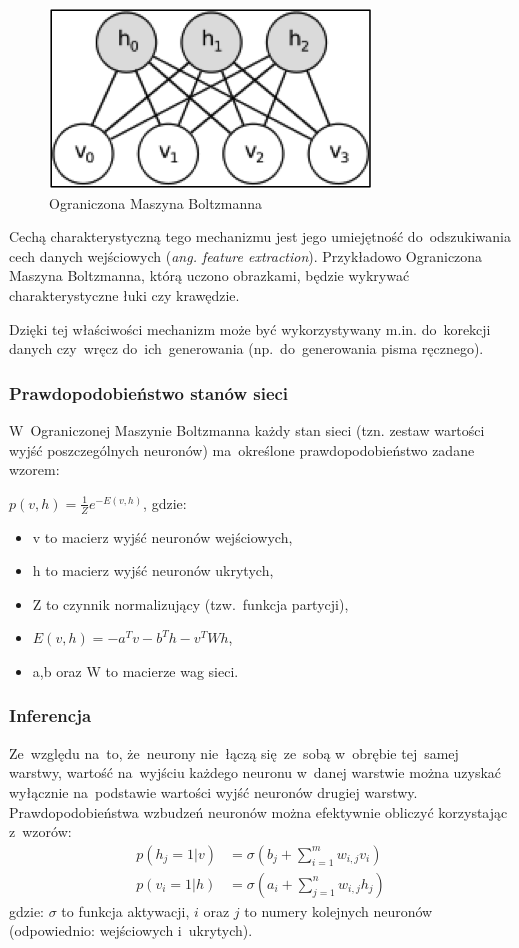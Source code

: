 \begin{figure}
	\centering
	\includegraphics[width=0.5\linewidth]{img/RBM.png}
	\caption{Ograniczona Maszyna Boltzmanna}
\end{figure}

Cechą charakterystyczną tego mechanizmu jest jego umiejętność do~odszukiwania cech danych wejściowych
(\textit{ang. feature extraction}). Przykładowo Ograniczona Maszyna Boltzmanna, którą uczono obrazkami, będzie
wykrywać charakterystyczne łuki czy krawędzie.

Dzięki tej właściwości mechanizm może być wykorzystywany m.in. do~korekcji danych czy~wręcz do~ich~generowania
(np.~do~generowania pisma ręcznego).

\subsubsection{Prawdopodobieństwo stanów sieci}
W~Ograniczonej Maszynie Boltzmanna każdy stan sieci (tzn. zestaw wartości wyjść poszczególnych neuronów)
ma~określone prawdopodobieństwo zadane wzorem:

$p(v,h)=\frac{1}{Z}e^{-E(v,h)}$, gdzie:
\begin{itemize}
  \item v to macierz wyjść neuronów wejściowych,
  \item h to macierz wyjść neuronów ukrytych,
  \item Z to czynnik normalizujący (tzw.~funkcja partycji),
  \item $E(v,h)=-a^{T}v-b^{T}h-v^{T}Wh$,
  \item a,b oraz W to macierze wag sieci.
\end{itemize}

\subsubsection{Inferencja}
Ze~względu na~to, że~neurony nie~łączą się~ze~sobą w~obrębie tej~samej warstwy, wartość na~wyjściu każdego
neuronu w~danej warstwie można uzyskać wyłącznie na~podstawie wartości wyjść neuronów drugiej warstwy.
Prawdopodobieństwa wzbudzeń neuronów można efektywnie obliczyć korzystając z~wzorów:
\begin{equation}
    \begin{split}
        p(h_{j}=1|v)&=\sigma(b_{j}+\sum\limits_{i=1}^{m}w_{i,j}v_{i}) \\
        p(v_{i}=1|h)&=\sigma(a_{i}+\sum\limits_{j=1}^{n}w_{i,j}h_{j})
    \end{split}
	\label{eqn:rbm_inference}
\end{equation}
gdzie: $\sigma$ to funkcja aktywacji, $i$ oraz $j$ to numery kolejnych neuronów (odpowiednio: wejściowych i~ukrytych).


